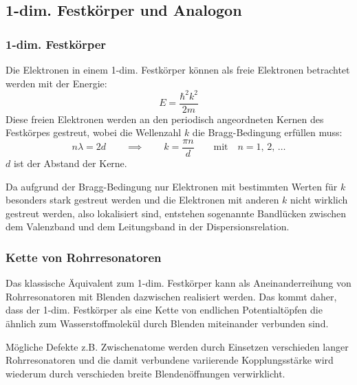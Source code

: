     \subsection{1-dim. Festkörper und Analogon}
        \subsubsection*{1-dim. Festkörper}
            Die Elektronen in einem 1-dim. Festkörper können als freie Elektronen betrachtet werden mit der Energie:
            \begin{equation*}
                E = \frac{\hbar^2 k^2}{2m}
            \end{equation*}
            Diese freien Elektronen werden an den periodisch angeordneten Kernen des Festkörpes gestreut, wobei die Wellenzahl $k$ die Bragg-Bedingung erfüllen muss:
            \begin{equation*}
                n \lambda = 2d \qquad \implies \qquad k = \frac{\pi n}{d} \qquad \text{mit} \quad n=1, \, 2, \, \ldots
            \end{equation*}
            $d$ ist der Abstand der Kerne.

            Da aufgrund der Bragg-Bedingung nur Elektronen mit bestimmten Werten für $k$ besonders stark gestreut werden und die Elektronen mit anderen $k$ nicht wirklich gestreut werden, also lokalisiert sind, entstehen sogenannte Bandlücken zwischen dem Valenzband und dem Leitungsband in der Dispersionsrelation.

        \subsubsection*{Kette von Rohrresonatoren}
            Das klassische Äquivalent zum 1-dim. Festkörper kann als Aneinanderreihung von Rohrresonatoren mit Blenden dazwischen realisiert werden.
            Das kommt daher, dass der 1-dim. Festkörper als eine Kette von endlichen Potentialtöpfen die ähnlich zum Wasserstoffmolekül durch Blenden miteinander verbunden sind.

            Mögliche Defekte z.B. Zwischenatome werden durch Einsetzen verschieden langer Rohrresonatoren und die damit verbundene variierende Kopplungsstärke wird wiederum durch verschieden breite Blendenöffnungen verwirklicht.